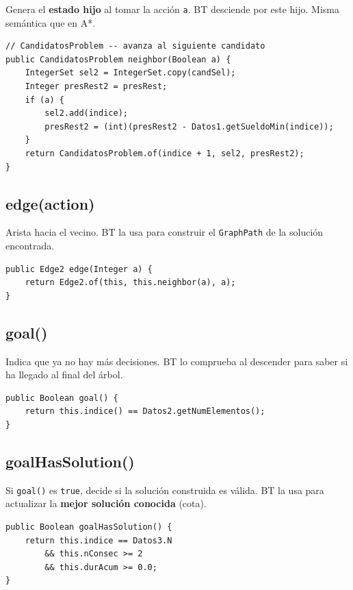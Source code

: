 \documentclass[12pt, a4paper]{article}
\begin{document}
Genera el \textbf{estado hijo} al tomar la acción \texttt{a}. BT desciende por este hijo. Misma semántica que en A*.

\begin{lstlisting}[style=java]
// CandidatosProblem -- avanza al siguiente candidato
public CandidatosProblem neighbor(Boolean a) {
    IntegerSet sel2 = IntegerSet.copy(candSel);
    Integer presRest2 = presRest;
    if (a) {
        sel2.add(indice);
        presRest2 = (int)(presRest2 - Datos1.getSueldoMin(indice));
    }
    return CandidatosProblem.of(indice + 1, sel2, presRest2);
}
\end{lstlisting}

\subsection{edge(action)}

Arista hacia el vecino. BT la usa para construir el \texttt{GraphPath} de la solución encontrada.

\begin{lstlisting}[style=java]
public Edge2 edge(Integer a) {
    return Edge2.of(this, this.neighbor(a), a);
}
\end{lstlisting}

\subsection{goal()}

Indica que ya no hay más decisiones. BT lo comprueba al descender para saber si ha llegado al final del árbol.

\begin{lstlisting}[style=java]
public Boolean goal() {
    return this.indice() == Datos2.getNumElementos();
}
\end{lstlisting}

\subsection{goalHasSolution()}

Si \texttt{goal()} es \texttt{true}, decide si la solución construida es válida. BT la usa para actualizar la \textbf{mejor solución conocida} (cota).

\begin{lstlisting}[style=java]
public Boolean goalHasSolution() {
    return this.indice == Datos3.N
        && this.nConsec >= 2
        && this.durAcum >= 0.0;
}
\end{lstlisting}
\end{document}
